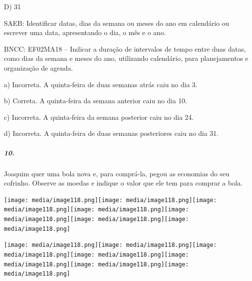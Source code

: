 D) 31

SAEB: Identificar datas, dias da semana ou meses do ano em
calendário ou escrever uma data, apresentando o dia, o mês e o ano.

BNCC: EF02MA18 -- Indicar a duração de intervalos de tempo entre duas
datas, como dias da semana e meses do ano, utilizando calendário, para
planejamentos e organização de agenda.

a) Incorreta. A quinta-feira de duas semanas atrás caiu no dia 3.

b) Correta. A quinta-feira da semana anterior caiu no dia 10.

c) Incorreta. A quinta-feira da semana posterior caiu no dia 24.

d) Incorreta. A quinta-feira de duas semanas posteriores caiu no dia 31.

\subparagraph{10. }\label{section-109}

Joaquim quer uma bola nova e, para comprá-la, pegou as economias do
seu cofrinho. Observe as moedas e indique o valor que ele tem para comprar a bola.

\texttt{[image: media/image118.png]}\texttt{[image: media/image118.png]}\texttt{[image: media/image118.png]}\texttt{[image: media/image118.png]}\texttt{[image: media/image118.png]}\texttt{[image: media/image118.png]}\texttt{[image: media/image118.png]}

\texttt{[image: media/image118.png]}\texttt{[image: media/image118.png]}\texttt{[image: media/image118.png]}\texttt{[image: media/image118.png]}\texttt{[image: media/image118.png]}\texttt{[image: media/image118.png]}\texttt{[image: media/image118.png]}

